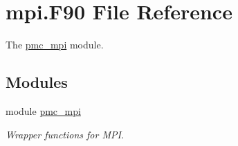 \hypertarget{mpi_8_f90}{}\section{mpi.\+F90 File Reference}
\label{mpi_8_f90}


The \mbox{\hyperlink{namespacepmc__mpi}{pmc\+\_\+mpi}} module.  


\subsection*{Modules}
\begin{DoxyCompactItemize}
\item 
module \mbox{\hyperlink{namespacepmc__mpi}{pmc\+\_\+mpi}}
\begin{DoxyCompactList}\small\item\em Wrapper functions for M\+PI. \end{DoxyCompactList}\end{DoxyCompactItemize}
